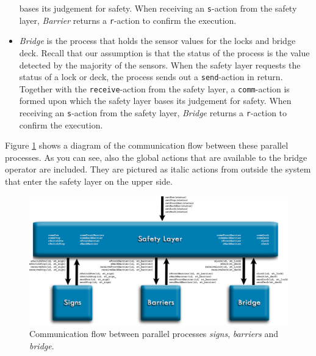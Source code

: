\begin{itemize}
	bases its judgement for safety. When receiving an \texttt{s}-action from the safety layer, \emph{Barrier} returns a \texttt{r}-action to confirm the execution.
	\item \emph{Bridge} is the process that holds the sensor values for the locks and bridge deck. Recall that our assumption is that the status of the process is the value detected by the majority of the sensors. When the 
	safety layer requests the status of a lock or deck, the process sends out a \texttt{send}-action in return. Together with the \texttt{receive}-action from the safety layer, a \texttt{comm}-action is formed upon which the safety 
	layer 	bases its judgement for safety. When receiving an \texttt{s}-action from the safety layer, \emph{Bridge} returns a \texttt{r}-action to confirm the execution.
\end{itemize}
%
Figure \ref{fig:arch} shows a diagram of the communication flow between these parallel processes. As you can see, also the global actions that are available to the bridge operator are included. They are pictured as italic actions from outside the system that enter the safety layer on the upper side.
%
\begin{figure}[htb]%
\centering
\includegraphics[width=\columnwidth]{Images/Architecture_2}%
\caption{Communication flow between parallel processes \emph{signs}, \emph{barriers} and \emph{bridge}.}%
\label{fig:arch}%
\end{figure}
%

\newpage
